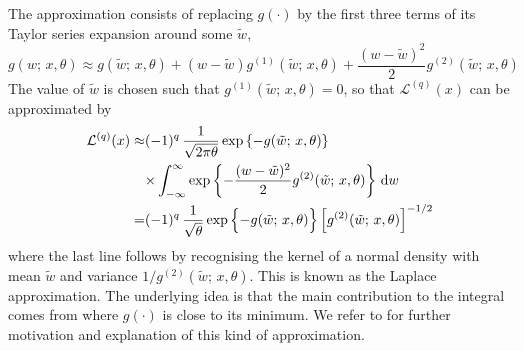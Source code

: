 The approximation consists of replacing $g(\cdot)$ by the first three terms of its Taylor series expansion around some $\tilde{w}$,
\[
g(w;\, x, \theta) \approx g(\tilde{w};\, x, \theta) + (w - \tilde{w}) g^{(1)}(\tilde{w};\, x, \theta) + 
  \frac{(w - \tilde{w})^2}{2} g^{(2)}(\tilde{w};\, x, \theta)
\]
% 
The value of $\tilde{w}$ is chosen such that $g^{(1)}(\tilde{w};\, x, \theta) = 0$, so that $\mathcal{L}^{(q)}(x)$ can be approximated by 
\begin{align*}
\mathcal{L}^{(q)}(x) 
  \approx& (-1)^q \, \frac{1}{\sqrt{2 \pi \theta}} \exp \left\{ - g(\tilde{w};\, x, \theta) \right\} \\
  & {\times \int_{-\infty}^\infty \exp \left\{ - \frac{(w - \tilde{w})^2}{2} g^{(2)}(\tilde{w};\, x, \theta) \right\} \, \textrm{d}w} \\
  =& (-1)^q \, \frac{1}{\sqrt{\theta}} \exp \left\{- g(\tilde{w};\, x, \theta) \vphantom{\Big\}} \right\} \left[ g^{(2)}(\tilde{w};\, x, \theta) \right]^{- 1 \slash 2}
\end{align*}
where the last line follows by recognising the kernel of a normal density with mean $\tilde{w}$ and variance $1 / g^{(2)}(\tilde{w};\, x, \theta)$.
This is known as the Laplace approximation. The underlying idea is that the main contribution to the integral comes from where $g(\cdot)$ is close to its minimum.
We refer to \cite{GoutisCasella99} for further motivation and explanation of this kind of approximation.
